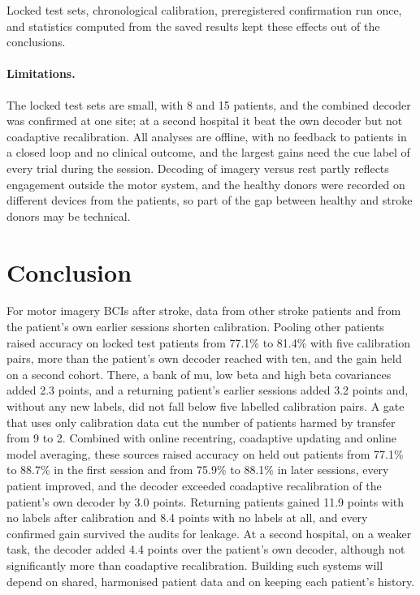 \documentclass[pdflatex,sn-mathphys-num]{sn-jnl}
\begin{document}
Locked test sets, chronological calibration, preregistered confirmation run once, and statistics computed from the saved results kept these effects out of the conclusions.

\paragraph{Limitations.} The locked test sets are small, with 8 and 15 patients, and the combined decoder was confirmed at one site; at a second hospital it beat the own decoder but not coadaptive recalibration. All analyses are offline, with no feedback to patients in a closed loop and no clinical outcome, and the largest gains need the cue label of every trial during the session. Decoding of imagery versus rest partly reflects engagement outside the motor system, and the healthy donors were recorded on different devices from the patients, so part of the gap between healthy and stroke donors may be technical.

\section{Conclusion}\label{sec:conclusion}

For motor imagery BCIs after stroke, data from other stroke patients and from the patient's own earlier sessions shorten calibration. Pooling other patients raised accuracy on locked test patients from 77.1\% to 81.4\% with five calibration pairs, more than the patient's own decoder reached with ten, and the gain held on a second cohort. There, a bank of mu, low beta and high beta covariances added 2.3 points, and a returning patient's earlier sessions added 3.2 points and, without any new labels, did not fall below five labelled calibration pairs. A gate that uses only calibration data cut the number of patients harmed by transfer from 9 to 2. Combined with online recentring, coadaptive updating and online model averaging, these sources raised accuracy on held out patients from 77.1\% to 88.7\% in the first session and from 75.9\% to 88.1\% in later sessions, every patient improved, and the decoder exceeded coadaptive recalibration of the patient's own decoder by 3.0 points. Returning patients gained 11.9 points with no labels after calibration and 8.4 points with no labels at all, and every confirmed gain survived the audits for leakage. At a second hospital, on a weaker task, the decoder added 4.4 points over the patient's own decoder, although not significantly more than coadaptive recalibration. Building such systems will depend on shared, harmonised patient data and on keeping each patient's history.
\end{document}
